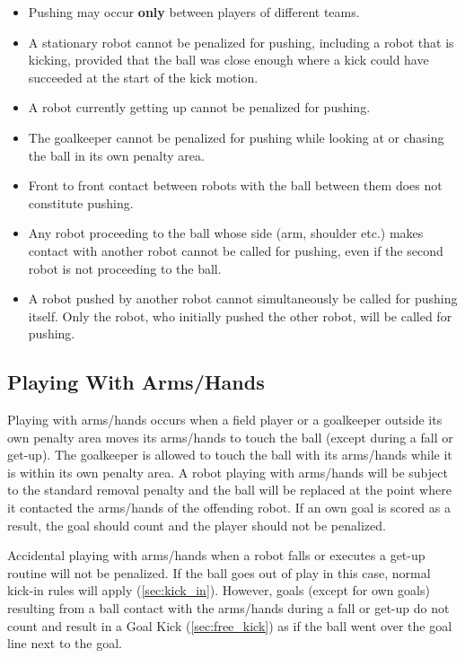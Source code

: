 \begin{itemize}
  \item Pushing may occur \textbf{only} between players of different teams.
  \item A stationary robot cannot be penalized for pushing, including a robot that is kicking, provided that the ball was close enough where a kick could have succeeded at the start of the kick motion.
  \item A robot currently getting up cannot be penalized for pushing.
  \item The goalkeeper cannot be penalized for pushing while looking at or chasing the ball in its own penalty area.
  \item Front to front contact between robots with the ball between them does not constitute pushing.
  \item Any robot proceeding to the ball whose side (\ie arm, shoulder etc.) makes contact with another robot cannot be called for pushing, even if the second robot is not proceeding to the ball.
  \item A robot pushed by another robot cannot simultaneously be called for pushing itself. Only the robot, who initially pushed the other robot, will be called for pushing.
\end{itemize}

\subsection{Playing With Arms/Hands}
\label{sec:hand_ball}

Playing with arms/hands occurs when a field player or a goalkeeper outside its own penalty area moves its arms/hands to touch the ball (except during a fall or get-up).  The goalkeeper is allowed to touch the ball with its arms/hands while it is within its own penalty area.  A robot playing with arms/hands will be subject to the standard removal penalty and the ball will be replaced at the point where it contacted the arms/hands of the offending robot.  If an own goal is scored as a result, the goal should count and the player should not be penalized.

Accidental playing with arms/hands when a robot falls or executes a get-up routine will not be penalized. If the ball goes out of play in this case, normal kick-in rules will apply (\cf \cref{sec:kick_in}). However, goals (except for own goals) resulting from a ball contact with the arms/hands during a fall or get-up do not count and result in a Goal Kick (\cf \cref{sec:free_kick}) as if the ball went over the goal line next to the goal.

